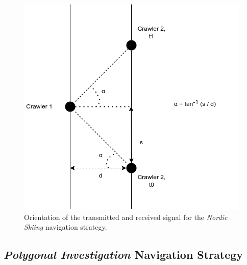 \begin{figure}[h!]
	\centering
	\includegraphics[scale=0.9]{graphics/angle_ski_nordique.png}
	\caption{Orientation of the transmitted and received signal for the \textit{Nordic Skiing} navigation strategy.}
	\label{fig:angle_ski_nordique}
\end{figure}

\subsection*{\textit{Polygonal Investigation} Navigation Strategy}

